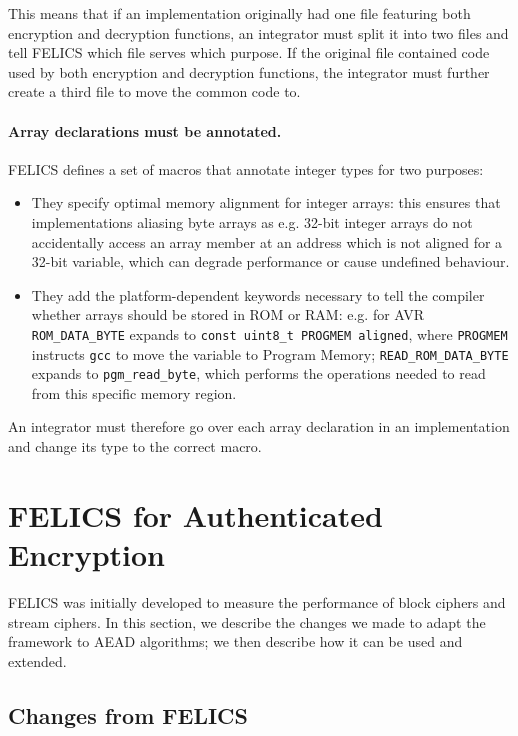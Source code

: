 \documentclass{article}
\begin{document}
This means that if an implementation originally had one file featuring
both encryption and decryption functions, an integrator must split it
into two files and tell FELICS which file serves which purpose.  If
the original file contained code used by both encryption and
decryption functions, the integrator must further create a third file
to move the common code to.

\paragraph{Array declarations must be annotated.}

FELICS defines a set of macros that annotate integer types for two
purposes:

\begin{itemize}
\item They specify optimal memory alignment for integer arrays: this
  ensures that implementations aliasing byte arrays as e.g. 32-bit
  integer arrays do not accidentally access an array member at an
  address which is not aligned for a 32-bit variable, which can
  degrade performance or cause undefined behaviour.

\item They add the platform-dependent keywords necessary to tell the
  compiler whether arrays should be stored in ROM or RAM: e.g. for AVR
  \texttt{ROM\_DATA\_BYTE} expands to \texttt{const uint8\_t PROGMEM
    aligned}, where \texttt{PROGMEM} instructs \texttt{gcc} to move
  the variable to Program Memory; \texttt{READ\_ROM\_DATA\_BYTE}
  expands to \texttt{pgm\_read\_byte}, which performs the operations
  needed to read from this specific memory region.
\end{itemize}

An integrator must therefore go over each array declaration in an
implementation and change its type to the correct macro.

\section{FELICS for Authenticated Encryption}
\label{sec:felics-ae}

FELICS was initially developed to measure the performance of block
ciphers and stream ciphers.  In this section, we describe the changes
we made to adapt the framework to AEAD algorithms; we then describe
how it can be used and extended.

\subsection{Changes from FELICS}
\label{sec:felics-ae/diff-felics}
\end{document}
